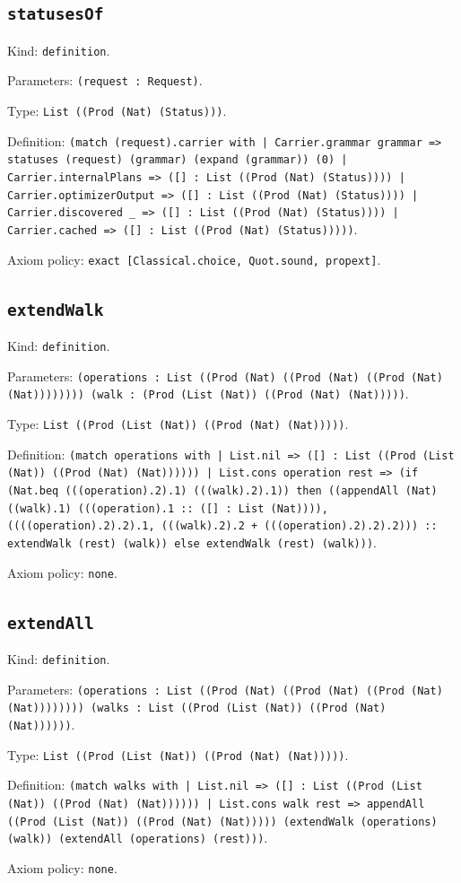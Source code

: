 \documentclass[11pt]{article}
\begin{document}
\subsection*{\texttt{statusesOf}}
\noindent Kind: \texttt{definition}.\par
\noindent Parameters: \texttt{(request : Request)}.\par
\noindent Type: \texttt{List ((Prod (Nat) (Status)))}.\par
\noindent Definition: \texttt{(match (request).carrier with | Carrier.grammar grammar => statuses (request) (grammar) (expand (grammar)) (0) | Carrier.internalPlans => ([] : List ((Prod (Nat) (Status)))) | Carrier.optimizerOutput => ([] : List ((Prod (Nat) (Status)))) | Carrier.discovered \_ => ([] : List ((Prod (Nat) (Status)))) | Carrier.cached => ([] : List ((Prod (Nat) (Status)))))}.\par
\noindent Axiom policy: \texttt{exact [Classical.choice, Quot.sound, propext]}.\par
\subsection*{\texttt{extendWalk}}
\noindent Kind: \texttt{definition}.\par
\noindent Parameters: \texttt{(operations : List ((Prod (Nat) ((Prod (Nat) ((Prod (Nat) (Nat)))))))) (walk : (Prod (List (Nat)) ((Prod (Nat) (Nat)))))}.\par
\noindent Type: \texttt{List ((Prod (List (Nat)) ((Prod (Nat) (Nat)))))}.\par
\noindent Definition: \texttt{(match operations with | List.nil => ([] : List ((Prod (List (Nat)) ((Prod (Nat) (Nat)))))) | List.cons operation rest => (if (Nat.beq (((operation).2).1) (((walk).2).1)) then ((appendAll (Nat) ((walk).1) (((operation).1 :: ([] : List (Nat)))), ((((operation).2).2).1, (((walk).2).2 + (((operation).2).2).2))) :: extendWalk (rest) (walk)) else extendWalk (rest) (walk)))}.\par
\noindent Axiom policy: \texttt{none}.\par
\subsection*{\texttt{extendAll}}
\noindent Kind: \texttt{definition}.\par
\noindent Parameters: \texttt{(operations : List ((Prod (Nat) ((Prod (Nat) ((Prod (Nat) (Nat)))))))) (walks : List ((Prod (List (Nat)) ((Prod (Nat) (Nat))))))}.\par
\noindent Type: \texttt{List ((Prod (List (Nat)) ((Prod (Nat) (Nat)))))}.\par
\noindent Definition: \texttt{(match walks with | List.nil => ([] : List ((Prod (List (Nat)) ((Prod (Nat) (Nat)))))) | List.cons walk rest => appendAll ((Prod (List (Nat)) ((Prod (Nat) (Nat))))) (extendWalk (operations) (walk)) (extendAll (operations) (rest)))}.\par
\noindent Axiom policy: \texttt{none}.\par
\end{document}
